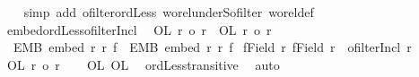 \begin{isabellebody}
\ \ \isamarkupfalse%
\ {\isacharparenleft}{\kern0pt}simp\ add{\isacharcolon}{\kern0pt}\ ofilter{\isacharunderscore}{\kern0pt}ordLess\ wo{\isacharunderscore}{\kern0pt}rel{\isachardot}{\kern0pt}underS{\isacharunderscore}{\kern0pt}ofilter\ wo{\isacharunderscore}{\kern0pt}rel{\isacharunderscore}{\kern0pt}def{\isacharparenright}{\kern0pt}\isanewline
{}\isamarkupfalse%
%
\endisatagproof
{\isafoldproof}%
%
\isadelimproof
\isanewline
%
\endisadelimproof
\isanewline
{}\isamarkupfalse%
\ embed{\isacharunderscore}{\kern0pt}ordLess{\isacharunderscore}{\kern0pt}ofilterIncl{\isacharcolon}{\kern0pt}\isanewline
{}\isanewline
\ \ OL{}{}{\isacharcolon}{\kern0pt}\ {\isachardoublequoteopen}r{}\ {\isacharless}{\kern0pt}o\ r{}{\isachardoublequoteclose}\ \ OL{}{}{\isacharcolon}{\kern0pt}\ {\isachardoublequoteopen}r{}\ {\isacharless}{\kern0pt}o\ r{}{\isachardoublequoteclose}\ \isanewline
\ \ EMB{}{}{\isacharcolon}{\kern0pt}\ {\isachardoublequoteopen}embed\ r{}\ r{}\ f{}{}{\isachardoublequoteclose}\ \ EMB{}{}{\isacharcolon}{\kern0pt}\ {\isachardoublequoteopen}embed\ r{}\ r{}\ f{}{}{\isachardoublequoteclose}\isanewline
{}\ {\isachardoublequoteopen}{\isacharparenleft}{\kern0pt}f{}{}{\isacharbackquote}{\kern0pt}{\isacharparenleft}{\kern0pt}Field\ r{}{\isacharparenright}{\kern0pt}{\isacharcomma}{\kern0pt}\ f{}{}{\isacharbackquote}{\kern0pt}{\isacharparenleft}{\kern0pt}Field\ r{}{\isacharparenright}{\kern0pt}{\isacharparenright}{\kern0pt}\ {\isasymin}\ {\isacharparenleft}{\kern0pt}ofilterIncl\ r{}{\isacharparenright}{\kern0pt}{\isachardoublequoteclose}\isanewline
%
\isadelimproof
%
\endisadelimproof
%
\isatagproof
{}\isamarkupfalse%
{\isacharminus}{\kern0pt}\isanewline
\ \ \isamarkupfalse%
\ OL{}{}{\isacharcolon}{\kern0pt}\ {\isachardoublequoteopen}r{}\ {\isacharless}{\kern0pt}o\ r{}{\isachardoublequoteclose}\isanewline
\ \ \isamarkupfalse%
\ OL{}{}\ OL{}{}\ \isamarkupfalse%
\ ordLess{\isacharunderscore}{\kern0pt}transitive\ \isamarkupfalse%
\ auto\isanewline
\ \ \isamarkupfalse%

\end{isabellebody}

